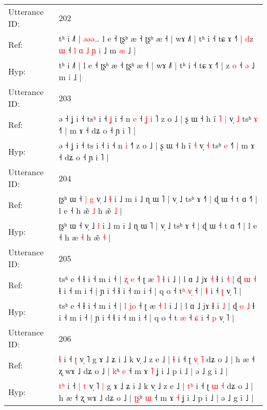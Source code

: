 \documentclass[10pt]{article}
\DeclareRobustCommand{\hl}[1]{{\textcolor{red}{#1}}}
\begin{document}
\begin{longtable}{ll}
 \\
\midrule
Utterance ID: & 202 \\
Ref: & tʰ i ˩˥ |\hl{ }\hl{ə}\hl{ə}\hl{ə}\hl{…} l e ˧ ʈʂʰ æ ˧ ʈʂʰ æ ˧ | wɤ ˩˥ | tʰ i ˧ tɕ ɤ ˧˥ | \hl{d}z \hl{ɯ} ˧\hl{ }\hl{l}\hl{ }\hl{ɑ}\hl{ }\hl{˩}\hl{ }\hl{ɲ} \hl{i} ˩ m \hl{æ} ˩ |
 \\
Hyp: & tʰ i ˩˥ |\hl{}\hl{}\hl{}\hl{}\hl{} l e ˧ ʈʂʰ æ ˧ ʈʂʰ æ ˧ | wɤ ˩˥ | tʰ i ˧ tɕ ɤ ˧˥ | \hl{}z \hl{o} ˧\hl{}\hl{}\hl{}\hl{}\hl{}\hl{}\hl{}\hl{} \hl{ə} ˩ m \hl{i} ˩ |
 \\
\midrule
Utterance ID: & 203 \\
Ref: & ə ˧ ʝ i ˧ ts\hl{ʰ} i ˧\hl{ }\hl{ʝ} i ˧ n \hl{e} ˧\hl{ }\hl{ʝ}\hl{ }\hl{i}\hl{ }˥ z o ˩ | ʂ ɯ ˧ h ĩ\hl{ }\hl{˥} \hl{|} v̩ \hl{˩} tsʰ \hl{ɤ} ˧˥ | m ɤ ˧ dʑ o ˧ ɲ i ˥ |
 \\
Hyp: & ə ˧ ʝ i ˧ ts\hl{} i ˧\hl{}\hl{} i ˧ n \hl{i} ˧\hl{}\hl{}\hl{}\hl{}\hl{}˥ z o ˩ | ʂ ɯ ˧ h ĩ\hl{}\hl{} \hl{˧} v̩ \hl{˧} tsʰ \hl{e} ˧˥ | m ɤ ˧ dʑ o ˧ ɲ i ˥ |
 \\
\midrule
Utterance ID: & 204 \\
Ref: & ʈʂʰ ɯ ˧\hl{ }\hl{|}\hl{ }\hl{g} v̩ ˩ \hl{ɬ} i ˩ m i ˩ ɳ ɯ ˥ | v̩ ˩ tsʰ ɤ ˧\hl{˥} | ɖ ɯ ˧ t ɑ ˧˥ | l e ˧ h æ\hl{̃} \hl{˩} h æ̃ \hl{˩} |
 \\
Hyp: & ʈʂʰ ɯ ˧\hl{}\hl{}\hl{}\hl{} v̩ ˩ \hl{l} i ˩ m i ˩ ɳ ɯ ˥ | v̩ ˩ tsʰ ɤ ˧\hl{} | ɖ ɯ ˧ t ɑ ˧˥ | l e ˧ h æ\hl{} \hl{˧} h æ̃ \hl{˧} |
 \\
\midrule
Utterance ID: & 205 \\
Ref: & tsʰ e ˧ ɬ i ˧ m i ˧ | \hl{ʐ} \hl{}\hl{e} ˧ ʈ æ \hl{˥} \hl{ɬ} i ˩ | l ɑ ˩ jɤ\hl{ }\hl{˧} ɬ i \hl{˧} | ɖ \hl{ɯ} \hl{˧} ɬ i ˧ m i ˧ | ɲ i ˧ ɬ i ˧ m i ˧ | q o ˧ t\hl{ʰ} \hl{v}\hl{̩} ˧\hl{ }\hl{|} \hl{ɬ} i ˧ \hl{ʈ} v̩ ˥ |
 \\
Hyp: & tsʰ e ˧ ɬ i ˧ m i ˧ | \hl{l} \hl{j}\hl{o} ˧ ʈ æ \hl{˧} \hl{l} i ˩ | l ɑ ˩ jɤ\hl{}\hl{} ɬ i \hl{˩} | ɖ \hl{o} \hl{˩} ɬ i ˧ m i ˧ | ɲ i ˧ ɬ i ˧ m i ˧ | q o ˧ t\hl{} \hl{}\hl{æ} ˧\hl{}\hl{} \hl{ɕ} i ˧ \hl{p} v̩ ˥ |
 \\
\midrule
Utterance ID: & 206 \\
Ref: & \hl{}\hl{ɬ} i ˧\hl{}\hl{} \hl{ʈ} v̩ ˥\hl{}\hl{} g ɤ ˩ ʑ i ˩ k v̩ ˩ z e ˩ | \hl{}\hl{ɬ} i ˧ ʈ \hl{v}\hl{̩} \hl{˥} dʑ o ˩ | h æ ˧ ʐ wɤ ˩ dʑ o ˩ | \hl{}\hl{k}ʰ \hl{e} ˧ m ɤ \hl{˥} ʝ i ˩ p i ˩ | ə ˩ g i ˩ |
 \\
Hyp: & \hl{t}\hl{ʰ} i ˧\hl{ }\hl{|} \hl{t} v̩ ˥\hl{ }\hl{|} g ɤ ˩ ʑ i ˩ k v̩ ˩ z e ˩ | \hl{t}\hl{ʰ} i ˧ ʈ \hl{}\hl{ɯ} \hl{˧} dʑ o ˩ | h æ ˧ ʐ wɤ ˩ dʑ o ˩ | \hl{ʈ}\hl{ʂ}ʰ \hl{ɯ} ˧ m ɤ \hl{˧} ʝ i ˩ p i ˩ | ə ˩ g i ˩ |

\end{longtable}
\end{document}
